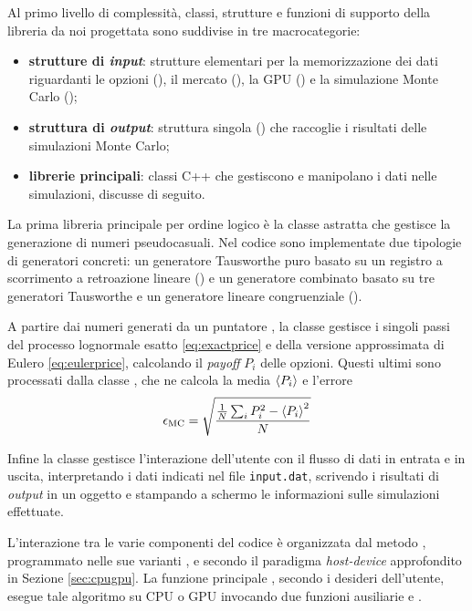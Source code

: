 Al primo livello di complessità, classi, strutture e funzioni di supporto della libreria da noi progettata sono suddivise in tre macrocategorie:

\begin{itemize}
    \item \textbf{strutture di \textit{input}}: strutture elementari per la memorizzazione dei dati riguardanti le opzioni (), il mercato (), la GPU () e la simulazione Monte Carlo ();
    \item \textbf{struttura di \textit{output}}: struttura singola () che raccoglie i risultati delle simulazioni Monte Carlo;
    \item \textbf{librerie principali}: classi C++ che gestiscono e manipolano i dati nelle simulazioni, discusse di seguito.
\end{itemize}

La prima libreria principale per ordine logico è la classe astratta  che gestisce la generazione di numeri pseudocasuali. Nel codice sono implementate due tipologie di generatori concreti: un generatore Tausworthe puro basato su un registro a scorrimento a retroazione lineare () e un generatore combinato basato su tre generatori Tausworthe e un generatore lineare congruenziale ().

A partire dai numeri generati da un puntatore , la classe  gestisce i singoli passi del processo lognormale esatto \eqref{eq:exactprice} e della versione approssimata di Eulero \eqref{eq:eulerprice}, calcolando il \textit{payoff} $P_i$ delle opzioni. Questi ultimi sono processati dalla classe , che ne calcola la media $\braket{P_i}$ e l'errore
\begin{equation}
    \epsilon_\text{MC} = \sqrt{\frac{\frac{1}{N}\sum_i{P_i^2} - \braket{P_i}^2}{N}}
    \label{eq:mcerror}
\end{equation}

Infine la classe  gestisce l'interazione dell'utente con il flusso di dati in entrata e in uscita, interpretando i dati indicati nel file \verb|input.dat|, scrivendo i risultati di \textit{output} in un oggetto  e stampando a schermo le informazioni sulle simulazioni effettuate.

L'interazione tra le varie componenti del codice è organizzata dal metodo  , programmato nelle sue varianti ,  e  secondo il paradigma \textit{host-device} approfondito in Sezione \ref{sec:cpugpu}. La funzione principale , secondo i desideri dell'utente, esegue tale algoritmo su CPU o GPU invocando due funzioni ausiliarie  e .

